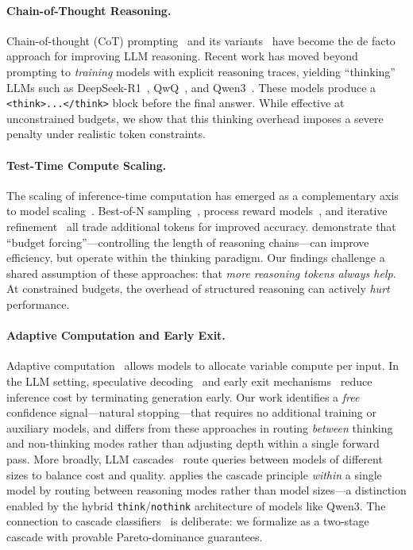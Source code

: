 
\paragraph{Chain-of-Thought Reasoning.}
Chain-of-thought (CoT) prompting~\citep{wei2022chain} and its variants~\citep{wang2023selfconsistency, yao2023tree} have become the de facto approach for improving LLM reasoning.
Recent work has moved beyond prompting to \emph{training} models with explicit reasoning traces, yielding ``thinking'' LLMs such as DeepSeek-R1~\citep{deepseekr1}, QwQ~\citep{qwq2024}, and Qwen3~\citep{qwen3_2025}.
These models produce a \texttt{<think>...</think>} block before the final answer.
While effective at unconstrained budgets, we show that this thinking overhead imposes a severe penalty under realistic token constraints.

\paragraph{Test-Time Compute Scaling.}
The scaling of inference-time computation has emerged as a complementary axis to model scaling~\citep{snell2024scaling}.
Best-of-N sampling~\citep{lightman2023prm}, process reward models~\citep{wang2024math}, and iterative refinement~\citep{madaan2023selfrefine} all trade additional tokens for improved accuracy.
\citet{muennighoff2025s1} demonstrate that ``budget forcing''---controlling the length of reasoning chains---can improve efficiency, but operate within the thinking paradigm.
Our findings challenge a shared assumption of these approaches: that \emph{more reasoning tokens always help}.
At constrained budgets, the overhead of structured reasoning can actively \emph{hurt} performance.

\paragraph{Adaptive Computation and Early Exit.}
Adaptive computation~\citep{graves2016adaptive, dehghani2019universal} allows models to allocate variable compute per input.
In the LLM setting, speculative decoding~\citep{leviathan2023fast, chen2023accelerating} and early exit mechanisms~\citep{schuster2022confident, bae2023fast} reduce inference cost by terminating generation early.
Our work identifies a \emph{free} confidence signal---natural stopping---that requires no additional training or auxiliary models, and differs from these approaches in routing \emph{between} thinking and non-thinking modes rather than adjusting depth within a single forward pass.
More broadly, LLM cascades~\citep{chen2023frugalgpt} route
queries between models of different sizes to balance cost and quality.
\method{} applies the cascade principle \emph{within} a single model by
routing between reasoning modes rather than model sizes---a distinction
enabled by the hybrid \texttt{think}/\texttt{nothink} architecture of
models like Qwen3.
The connection to cascade classifiers~\citep{viola2001rapid} is deliberate: we formalize \method{} as a two-stage cascade with provable Pareto-dominance guarantees.

